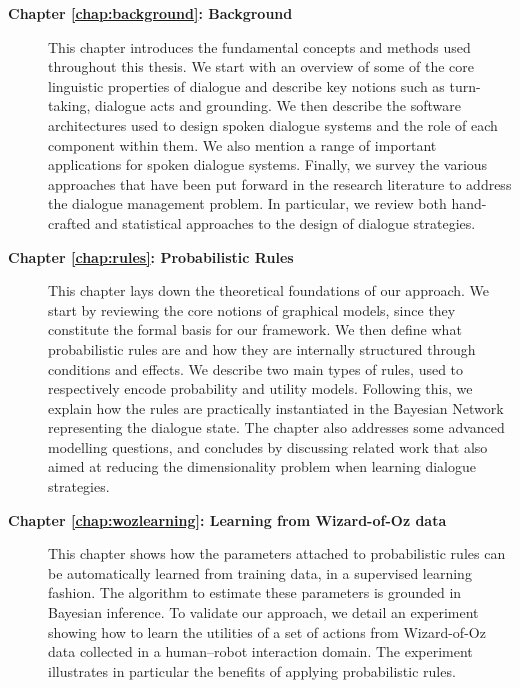 \begin{description}
  \item[\textbf{Chapter \ref{chap:background}: Background}] \hfill  \vspace{2mm}
  
This chapter introduces the fundamental concepts and methods used throughout this thesis. We start with an overview of some of the core linguistic properties of dialogue and describe key notions such as turn-taking, dialogue acts and grounding.  We then describe the software architectures used to design spoken dialogue systems and the role of each component within them.  We also mention a range of important applications for spoken dialogue systems. Finally, we survey the various approaches that have been put forward in the research literature to address the dialogue management problem.  In particular, we review both hand-crafted and statistical approaches to the design of dialogue strategies.   \vspace{2mm}

  \item[\textbf{Chapter \ref{chap:rules}: Probabilistic Rules}] \hfill \vspace{2mm}
 
  This chapter lays down the theoretical foundations of our approach.  We start by reviewing the core notions of graphical models, since they constitute the formal basis for our framework. We then define what probabilistic rules are and how they are internally structured through conditions and effects.  We describe two main types of rules, used to respectively encode probability and utility models. Following this, we explain how the rules are practically instantiated in the Bayesian Network representing the dialogue state.  The chapter also addresses some advanced modelling questions, and concludes by discussing related work that also aimed at reducing the dimensionality problem when learning dialogue strategies.  \vspace{2mm}
  
  \item[\textbf{Chapter \ref{chap:wozlearning}: Learning from Wizard-of-Oz data}] \hfill  \vspace{2mm}
  
 This chapter shows how the parameters attached to probabilistic rules can be automatically learned from training data, in a supervised learning fashion. The algorithm to estimate these parameters is grounded in Bayesian inference.  To validate our approach, we detail an experiment showing how to learn the utilities of a set of actions from Wizard-of-Oz data collected in a human--robot interaction domain.  The experiment illustrates in particular the benefits of applying probabilistic rules.  \vspace{2mm}


\end{description}
